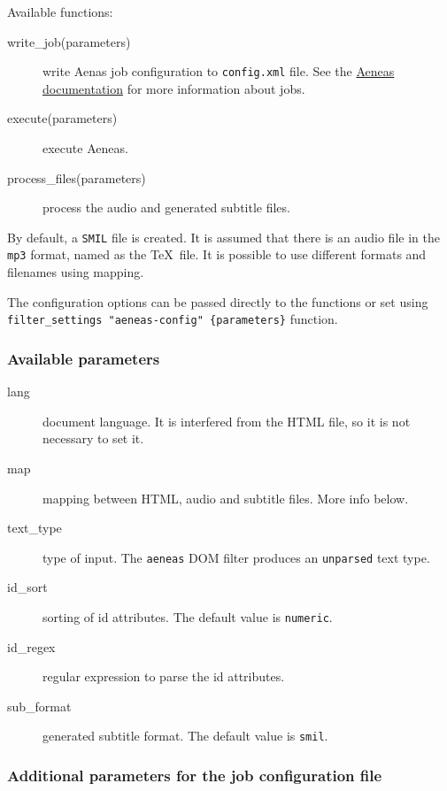 Available functions:

\begin{description}
\item[write\_job(parameters)]
write Aenas job configuration to \texttt{config.xml} file. See the
\href{https://www.readbeyond.it/aeneas/docs/clitutorial.html\#processing-jobs}{Aeneas
documentation} for more information about jobs.
\item[execute(parameters)]
execute Aeneas.
\item[process\_files(parameters)]
process the audio and generated subtitle files.
\end{description}

By default, a \texttt{SMIL} file is created. It is assumed that there is
an audio file in the \texttt{mp3} format, named as the \TeX~file. It is
possible to use different formats and filenames using mapping.

The configuration options can be passed directly to the functions or set
using \texttt{filter\_settings\ "aeneas-config"\ \{parameters\}}
function.

\hypertarget{available-parameters}{%
\subsubsection{Available parameters}\label{available-parameters}}

\begin{description}
\item[lang]
document language. It is interfered from the HTML file, so it is not
necessary to set it.
\item[map]
mapping between HTML, audio and subtitle files. More info below.
\item[text\_type]
type of input. The \texttt{aeneas} DOM filter produces an
\texttt{unparsed} text type.
\item[id\_sort]
sorting of id attributes. The default value is \texttt{numeric}.
\item[id\_regex]
regular expression to parse the id attributes.
\item[sub\_format]
generated subtitle format. The default value is \texttt{smil}.
\end{description}

\hypertarget{additional-parameters-for-the-job-configuration-file}{%
\subsubsection{Additional parameters for the job configuration
file}\label{additional-parameters-for-the-job-configuration-file}}

